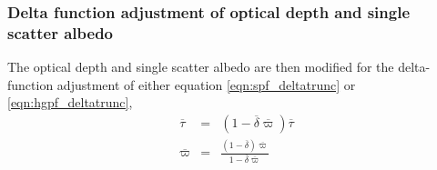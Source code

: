 \subsubsection{Delta function adjustment of optical depth and single scatter albedo}
The optical depth and single scatter albedo are then modified for the delta-function adjustment of either equation \ref{eqn:spf_deltatrunc} or \ref{eqn:hgpf_deltatrunc},
\begin{eqnarray}
  \overline{\tau}   &=& (1 - \overline{\delta}\overline{\varpi})\overline{\tau}\\
  \overline{\varpi} &=& \frac{(1 - \overline{\delta})\overline{\varpi}}{1 - \overline{\delta}\overline{\varpi}}
\end{eqnarray}







